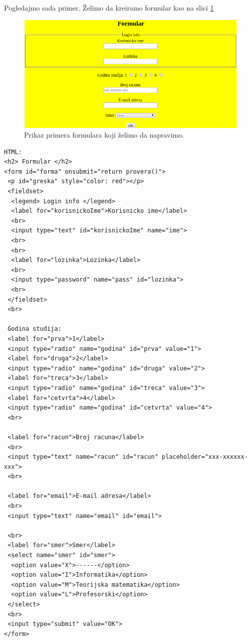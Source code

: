 Pogledajmo sada primer. Želimo da kreiramo formular kao na slici \ref{fig:formular}
\begin{figure}[h!]
\begin{center}
\includegraphics[scale=0.5]{../pictures/formular.png}
\end{center}
\caption{Prikaz primera formulara koji želimo da napravimo.}
\label{fig:formular}
\end{figure}	  

\begin{lstlisting}[backgroundcolor = \color{lightgray}, breaklines=true]
HTML:
<h2> Formular </h2>
<form id="forma" onsubmit="return provera()">
 <p id="greska" style="color: red"></p>
 <fieldset>
  <legend> Login info </legend>
  <label for="korisnickoIme">Korisnicko ime</label>
  <br>
  <input type="text" id="korisnickoIme" name="ime">
  <br>
  <br>
  <label for="lozinka">Lozinka</label>
  <br>
  <input type="password" name="pass" id="lozinka">
  <br>    
 </fieldset>
 <br>
 
 Godina studija:
 <label for="prva">1</label>
 <input type="radio" name="godina" id="prva" value="1">
 <label for="druga">2</label>
 <input type="radio" name="godina" id="druga" value="2">
 <label for="treca">3</label>
 <input type="radio" name="godina" id="treca" value="3">
 <label for="cetvrta">4</label>
 <input type="radio" name="godina" id="cetvrta" value="4">
 <br>

 <label for="racun">Broj racuna</label>
 <br>
 <input type="text" name="racun" id="racun" placeholder="xxx-xxxxxx-xxx">
 <br>
 
 <label for="email">E-mail adresa</label>
 <br>
 <input type="text" name="email" id="email">
                
 <br>
 <label for="smer">Smer</label>
 <select name="smer" id="smer">
  <option value="X">------</option>
  <option value="I">Informatika</option>
  <option value="M">Teorijska matematika</option>
  <option value="L">Profesorski</option>
 </select>
 <br>
 <input type="submit" value="OK">
</form>
\end{lstlisting}

